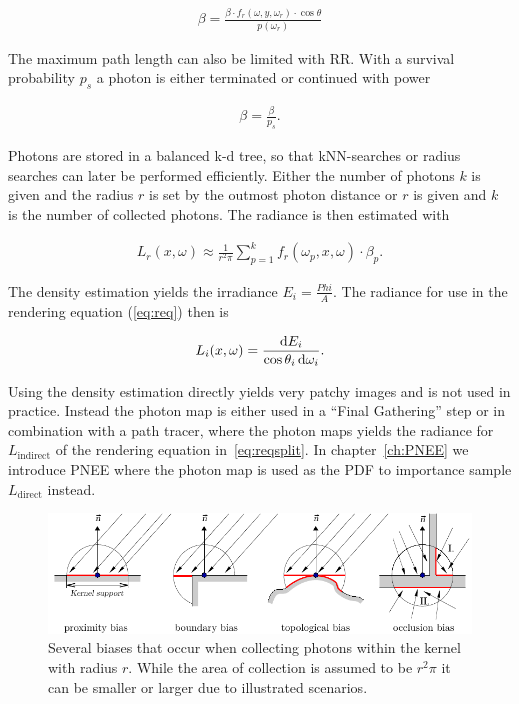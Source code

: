 \begin{align}
\beta = \frac{\beta \cdot f_r(\omega, y, \omega_r) \cdot \cos\theta}{p(\omega_r)}
\end{align}

The maximum path length can also be limited with RR. With a survival probability $p_s$ a photon is either terminated or continued with power

\begin{align}
\beta = \frac{\beta}{p_s}.
\end{align}

Photons are stored in a balanced k-d tree, so that kNN-searches or radius searches can later be performed efficiently. Either the number of photons $k$ is given and the radius $r$ is set by the outmost photon distance or $r$ is given and $k$ is the number of collected photons. The radiance is then estimated with

\begin{align}
L_r(x, \omega) \approx \frac{1}{r^2\pi} \sum_{p=1}^k f_r(\omega_p, x, \omega) \cdot \beta_p.
\end{align}

The density estimation yields the irradiance $E_i = \frac{Phi}{A}$. The radiance for use in the rendering equation (\ref{eq:req}) then is

\begin{align}
L_i(x, \omega) = \frac{\mathop{}\!\mathrm{d} E_i}{\cos\theta_i\mathop{}\!\mathrm{d}\omega_i}.
\end{align}

Using the density estimation directly yields very patchy images and is not used in practice. Instead the photon map is either used in a \enquote{Final Gathering} step or in combination with a path tracer, where the photon maps yields the radiance for $L_\text{indirect}$ of the rendering equation in~\ref{eq:reqsplit}. In chapter~\ref{ch:PNEE} we introduce PNEE where the photon map is used as the PDF to importance sample $L_\text{direct}$ instead.

\begin{figure}
    \centering
    \includegraphics[width=1\textwidth]{figures/biases.pdf}
    \caption{Several biases that occur when collecting photons within the kernel with radius $r$. While the area of collection is assumed to be $r^2\pi$ it can be smaller or larger due to illustrated scenarios.\protect\footnotemark}
    \label{fig:biases}
\end{figure}

